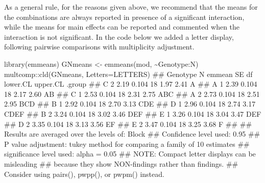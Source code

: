\documentclass[a4paper,12pt,oneside]{book}
\newenvironment{Shaded}{\begin{snugshade}}{\end{snugshade}}
\newcommand{\SpecialCharTok}[1]{#1}
\newcommand{\DocumentationTok}[1]{#1}
\newcommand{\OtherTok}[1]{#1}
\newcommand{\FunctionTok}[1]{#1}
\newcommand{\AttributeTok}[1]{#1}
\newcommand{\AlertTok}[1]{#1}
\newcommand{\NormalTok}[1]{#1}
\begin{document}
As a general rule, for the reasons given above, we recommend that the means for the combinations are always reported in presence of a significant interaction, while the means for main effects can be reported and commented when the interaction is not significant. In the code below we added a letter display, following pairwise comparisons with multiplicity adjustment.

\vspace{12pt}

\begin{Shaded}
\begin{Highlighting}[]
\FunctionTok{library}\NormalTok{(emmeans)}
\NormalTok{GNmeans }\OtherTok{\textless{}{-}} \FunctionTok{emmeans}\NormalTok{(mod, }\SpecialCharTok{\textasciitilde{}}\NormalTok{Genotype}\SpecialCharTok{:}\NormalTok{N)}
\NormalTok{multcomp}\SpecialCharTok{::}\FunctionTok{cld}\NormalTok{(GNmeans, }\AttributeTok{Letters=}\NormalTok{LETTERS)}
\DocumentationTok{\#\#  Genotype N emmean    SE df lower.CL upper.CL .group }
\DocumentationTok{\#\#  C        2   2.19 0.104 18     1.97     2.41  A     }
\DocumentationTok{\#\#  A        1   2.39 0.104 18     2.17     2.60  AB    }
\DocumentationTok{\#\#  C        1   2.53 0.104 18     2.31     2.75  ABC   }
\DocumentationTok{\#\#  A        2   2.73 0.104 18     2.51     2.95   BCD  }
\DocumentationTok{\#\#  B        1   2.92 0.104 18     2.70     3.13    CDE }
\DocumentationTok{\#\#  D        1   2.96 0.104 18     2.74     3.17    CDEF}
\DocumentationTok{\#\#  B        2   3.24 0.104 18     3.02     3.46     DEF}
\DocumentationTok{\#\#  E        1   3.26 0.104 18     3.04     3.47     DEF}
\DocumentationTok{\#\#  D        2   3.35 0.104 18     3.13     3.56      EF}
\DocumentationTok{\#\#  E        2   3.47 0.104 18     3.25     3.68       F}
\DocumentationTok{\#\# }
\DocumentationTok{\#\# Results are averaged over the levels of: Block }
\DocumentationTok{\#\# Confidence level used: 0.95 }
\DocumentationTok{\#\# P value adjustment: tukey method for comparing a family of 10 estimates }
\DocumentationTok{\#\# significance level used: alpha = 0.05 }
\DocumentationTok{\#\# }\AlertTok{NOTE}\DocumentationTok{: Compact letter displays can be misleading}
\DocumentationTok{\#\#       because they show NON{-}findings rather than findings.}
\DocumentationTok{\#\#       Consider using \textquotesingle{}pairs()\textquotesingle{}, \textquotesingle{}pwpp()\textquotesingle{}, or \textquotesingle{}pwpm()\textquotesingle{} instead.}
\end{Highlighting}
\end{Shaded}
\end{document}
